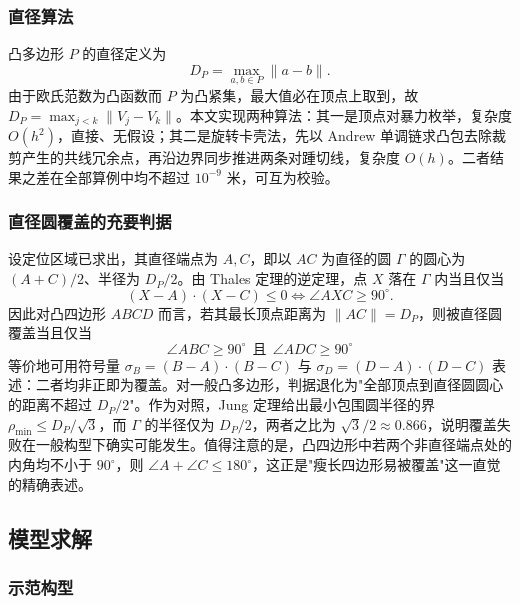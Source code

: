 \documentclass[12pt,a4paper]{ctexart}
\begin{document}
\subsubsection{直径算法}

凸多边形 $P$ 的直径定义为
\begin{equation}
D_P=\max_{a,b\in P}\lVert a-b\rVert .
\label{eq:diameter}
\end{equation}
由于欧氏范数为凸函数而 $P$ 为凸紧集，最大值必在顶点上取到，故 $D_P=\max_{j<k}\lVert V_j-V_k\rVert$。本文实现两种算法：其一是顶点对暴力枚举，复杂度 $O(h^2)$，直接、无假设；其二是旋转卡壳法，先以 Andrew 单调链求凸包去除裁剪产生的共线冗余点，再沿边界同步推进两条对踵切线，复杂度 $O(h)$。二者结果之差在全部算例中均不超过 $10^{-9}$ 米，可互为校验。

\subsubsection{直径圆覆盖的充要判据}

设定位区域已求出，其直径端点为 $A,C$，即以 $AC$ 为直径的圆 $\Gamma$ 的圆心为 $(A+C)/2$、半径为 $D_P/2$。由 Thales 定理的逆定理，点 $X$ 落在 $\Gamma$ 内当且仅当
\begin{equation}
(X-A)\cdot(X-C)\le 0\iff\angle AXC\ge 90^\circ .
\label{eq:thales}
\end{equation}
因此对凸四边形 $ABCD$ 而言，若其最长顶点距离为 $\lVert AC\rVert=D_P$，则被直径圆覆盖当且仅当
\begin{equation}
\boxed{\ \angle ABC\ge90^\circ\ \ \text{且}\ \ \angle ADC\ge90^\circ\ }
\label{eq:thales-condition}
\end{equation}
等价地可用符号量 $\sigma_B=(B-A)\cdot(B-C)$ 与 $\sigma_D=(D-A)\cdot(D-C)$ 表述：二者均非正即为覆盖。对一般凸多边形，判据退化为"全部顶点到直径圆圆心的距离不超过 $D_P/2$"。作为对照，Jung 定理给出最小包围圆半径的界 $\rho_{\min}\le D_P/\sqrt3$，而 $\Gamma$ 的半径仅为 $D_P/2$，两者之比为 $\sqrt3/2\approx0.866$，说明覆盖失败在一般构型下确实可能发生。值得注意的是，凸四边形中若两个非直径端点处的内角均不小于 $90^\circ$，则 $\angle A+\angle C\le180^\circ$，这正是"瘦长四边形易被覆盖"这一直觉的精确表述。

\subsection{模型求解}

\subsubsection{示范构型}
\end{document}
